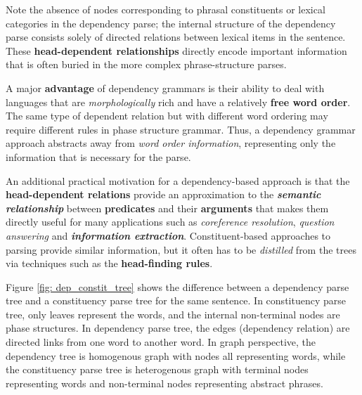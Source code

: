 \documentclass[11pt]{article}
\begin{document}
Note the absence of nodes corresponding to phrasal constituents or lexical categories in the dependency parse; the internal structure of the dependency parse consists solely of
directed relations between lexical items in the sentence. These \textbf{head-dependent relationships} directly encode important information that is often buried in the more
complex phrase-structure parses. 

A major \textbf{advantage} of dependency grammars is their ability to deal with languages that are \emph{morphologically} rich and have a relatively \textbf{free word order}. The same type of dependent relation but with different word ordering may require different rules in phase structure grammar. Thus, a dependency grammar approach abstracts away from \emph{word order information}, representing only the information that is necessary for the parse.

An additional practical motivation for a dependency-based approach is that the \textbf{head-dependent relations} provide an approximation to the \emph{\textbf{semantic relationship}} between \textbf{predicates} and their \textbf{arguments} that makes them directly useful for many applications such as \emph{coreference resolution}, \emph{question answering} and \emph{\textbf{information extraction}}. Constituent-based approaches to parsing provide similar information, but it
often has to be \emph{distilled} from the trees via techniques such as the \textbf{head-finding rules}.


Figure \ref{fig: dep_constit_tree} shows the difference between a dependency parse tree and a constituency parse tree for the same sentence. In constituency parse tree, only leaves represent the words, and the internal non-terminal nodes are phase structures. In dependency parse tree, the edges (dependency relation) are directed links from one word to another word. In graph perspective, the dependency tree is homogenous graph with nodes all representing words, while the constituency parse tree is heterogenous graph with terminal nodes representing words and non-terminal nodes representing abstract phrases. 
\end{document}
